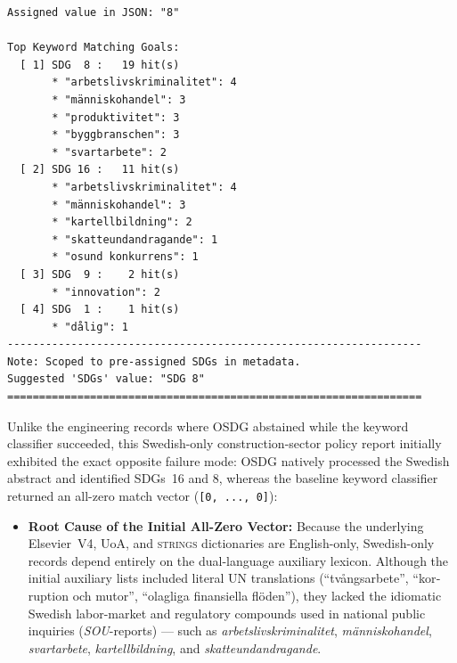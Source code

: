 \begin{casestudySection}
\begin{lstlisting}
Assigned value in JSON: "8"

Top Keyword Matching Goals:
  [ 1] SDG  8 :   19 hit(s)
       * "arbetslivskriminalitet": 4
       * "människohandel": 3
       * "produktivitet": 3
       * "byggbranschen": 3
       * "svartarbete": 2
  [ 2] SDG 16 :   11 hit(s)
       * "arbetslivskriminalitet": 4
       * "människohandel": 3
       * "kartellbildning": 2
       * "skatteundandragande": 1
       * "osund konkurrens": 1
  [ 3] SDG  9 :    2 hit(s)
       * "innovation": 2
  [ 4] SDG  1 :    1 hit(s)
       * "dålig": 1
-----------------------------------------------------------------
Note: Scoped to pre-assigned SDGs in metadata.
Suggested 'SDGs' value: "SDG 8"
=================================================================
\end{lstlisting}

Unlike the engineering records where OSDG abstained while the keyword classifier succeeded, this Swedish-only construction-sector policy report initially exhibited the exact opposite failure mode: OSDG natively processed the Swedish abstract and identified \glspl{SDG}~16 and 8, whereas the baseline keyword classifier returned an all-zero match vector (\texttt{[0, ..., 0]}):
\begin{itemize}
    \item \textbf{Root Cause of the Initial All-Zero Vector:} Because the underlying Elsevier~V4, UoA, and \textsc{strings} dictionaries are English-only, Swedish-only records depend entirely on the dual-language auxiliary lexicon. Although the initial auxiliary lists included literal \gls{UN} translations (\eg \enquote{\foreignlanguage{swedish}{tvångsarbete}}, \enquote{\foreignlanguage{swedish}{korruption och mutor}}, \enquote{\foreignlanguage{swedish}{olagliga finansiella flöden}}), they lacked the idiomatic Swedish labor-market and regulatory compounds used in national public inquiries (\emph{\foreignlanguage{swedish}{SOU}}-reports) --- such as \emph{\foreignlanguage{swedish}{arbetslivskriminalitet}}, \emph{\foreignlanguage{swedish}{människohandel}}, \emph{\foreignlanguage{swedish}{svartarbete}}, \emph{\foreignlanguage{swedish}{kartellbildning}}, and \emph{\foreignlanguage{swedish}{skatteundandragande}}.


\end{itemize}
\end{casestudySection}
